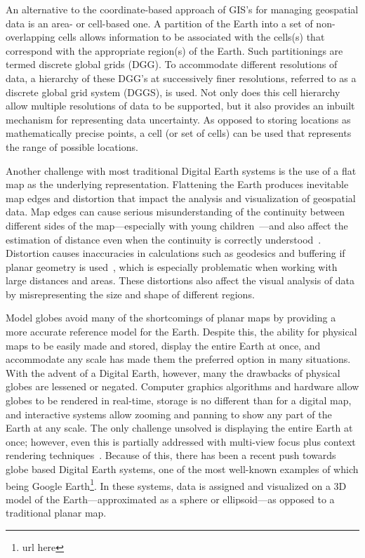 An alternative to the coordinate-based approach of GIS's for managing geospatial data is an area- or cell-based one.
A partition of the Earth into a set of non-overlapping cells allows information to be associated with the cells(s) that correspond with the appropriate region(s) of the Earth.
Such partitionings are termed discrete global grids (DGG).
To accommodate different resolutions of data, a hierarchy of these DGG's at successively finer resolutions, referred to as a discrete global grid system (DGGS), is used.
Not only does this cell hierarchy allow multiple resolutions of data to be supported, but it also provides an inbuilt mechanism for representing data uncertainty.
As opposed to storing locations as mathematically precise points, a cell (or set of cells) can be used that represents the range of possible locations.


Another challenge with most traditional Digital Earth systems is the use of a flat map as the underlying representation.
Flattening the Earth produces inevitable map edges and distortion that impact the analysis and visualization of geospatial data.
Map edges can cause serious misunderstanding of the continuity between different sides of the map---especially with young children~\cite{hennerdal2015beyond}---and also affect the estimation of distance even when the continuity is correctly understood~\cite{hruby20182000}.
Distortion causes inaccuracies in calculations such as geodesics and buffering if planar geometry is used~\cite{flaterbuffering}, which is especially problematic when working with large distances and areas.
These distortions also affect the visual analysis of data by misrepresenting the size and shape of different regions.


Model globes avoid many of the shortcomings of planar maps by providing a more accurate reference model for the Earth.
Despite this, the ability for physical maps to be easily made and stored, display the entire Earth at once, and accommodate any scale has made them the preferred option in many situations.
With the advent of a Digital Earth, however, many the drawbacks of physical globes are lessened or negated.
Computer graphics algorithms and hardware allow globes to be rendered in real-time, storage is no different than for a digital map, and interactive systems allow zooming and panning to show any part of the Earth at any scale.
The only challenge unsolved is displaying the entire Earth at once; however, even this is partially addressed with multi-view focus plus context rendering techniques~\cite{mark-sherlock}.
Because of this, there has been a recent push towards globe based Digital Earth systems, one of the most well-known examples of which being Google Earth\footnote{url here}.
In these systems, data is assigned and visualized on a 3D model of the Earth---approximated as a sphere or ellipsoid---as opposed to a traditional planar map.

